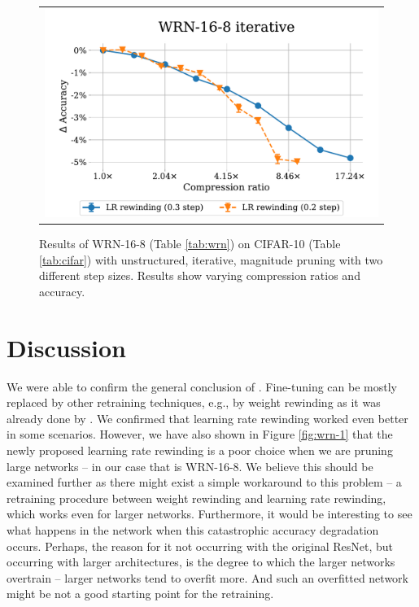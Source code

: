 \begin{figure}[H]
\setlength{\tabcolsep}{0pt}
  \begin{center}
    \begin{tabular}{c}
      \includegraphics[width=0.7\linewidth]{pics/WRN-16-8-LR-rew-compare2v3.pdf}\\
    \end{tabular}
  \end{center}
\caption{Results of WRN-16-8 (Table \ref{tab:wrn}) on CIFAR-10 (Table \ref{tab:cifar}) with unstructured, iterative, magnitude pruning with two different step sizes. Results show varying compression ratios and accuracy.}
\label{fig:wrn-2}
\end{figure}

\section{Discussion}

We were able to confirm the general conclusion of \cite{Renda}. Fine-tuning can be mostly replaced by other retraining techniques, e.g., by weight rewinding as it was already done by \cite{Frankle}. We confirmed that learning rate rewinding worked even better in some scenarios. However, we have also shown in Figure \ref{fig:wrn-1} that the newly proposed learning rate rewinding is a poor choice when we are pruning large networks -- in our case that is WRN-16-8. We believe this should be examined further as there might exist a simple workaround to this problem -- a retraining procedure between weight rewinding and learning rate rewinding, which works even for larger networks. Furthermore, it would be interesting to see what happens in the network when this catastrophic accuracy degradation occurs. Perhaps, the reason for it not occurring with the original ResNet, but occurring with larger architectures, is the degree to which the larger networks overtrain -- larger networks tend to overfit more. And such an overfitted network might be not a good starting point for the retraining.


